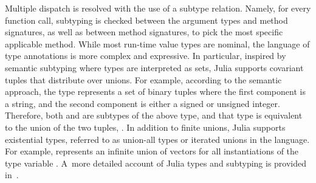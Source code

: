 
Multiple dispatch is resolved with the use of a subtype relation.
Namely, for every function call, subtyping is checked between
the argument types and method signatures,
as well as between method signatures,
to pick the most specific applicable method.
While most run-time value types are nominal, %
the language of type annotations is more complex and expressive. 
In particular, inspired by semantic subtyping
where types are interpreted as sets,
Julia supports covariant tuples that distribute over unions.
For example, according to the semantic approach, the type 
 represents a set of binary
tuples where the first component is a string, and the second component is
either a signed or unsigned integer. Therefore, both
 and  are subtypes
of the above type, and that type is equivalent to the union of the two
tuples, .
In addition to finite unions, Julia supports existential types, referred to as
union-all types or iterated unions in the language. 
For example, 
represents an infinite union of vectors  for all
instantiations  of the type variable .
A~more detailed account of Julia types and subtyping
is provided in~.

